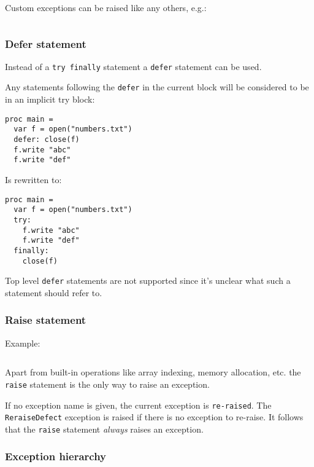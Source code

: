 Custom exceptions can be raised like any others, e.g.:

\begin{verbatim}
\end{verbatim}

\hypertarget{defer-statement}{%
\subsubsection{Defer statement}\label{defer-statement}}

Instead of a \texttt{try\ finally} statement a \texttt{defer} statement
can be used.

Any statements following the \texttt{defer} in the current block will be
considered to be in an implicit try block:

\begin{verbatim}
proc main =
  var f = open("numbers.txt")
  defer: close(f)
  f.write "abc"
  f.write "def"
\end{verbatim}

Is rewritten to:

\begin{verbatim}
proc main =
  var f = open("numbers.txt")
  try:
    f.write "abc"
    f.write "def"
  finally:
    close(f)
\end{verbatim}

Top level \texttt{defer} statements are not supported since it's unclear
what such a statement should refer to.

\hypertarget{raise-statement}{%
\subsubsection{Raise statement}\label{raise-statement}}

Example:

\begin{verbatim}
\end{verbatim}

Apart from built-in operations like array indexing, memory allocation,
etc. the \texttt{raise} statement is the only way to raise an exception.

If no exception name is given, the current exception is
\texttt{re-raised}. The \texttt{ReraiseDefect} exception is raised if
there is no exception to re-raise. It follows that the \texttt{raise}
statement \emph{always} raises an exception.

\hypertarget{exception-hierarchy}{%
\subsubsection{Exception hierarchy}\label{exception-hierarchy}}

